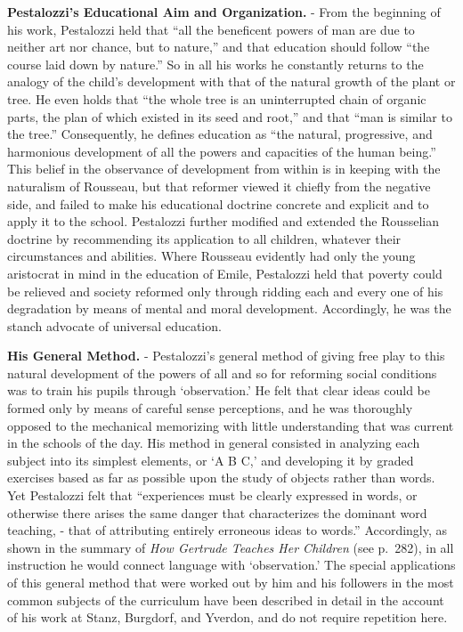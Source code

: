 \documentclass[]{book}
\begin{document}
\textbf{Pestalozzi's Educational Aim and Organization.} - From the beginning of his work, Pestalozzi held that ``all the beneficent powers of man are due to neither art nor chance, but to nature,'' and that education should follow ``the course laid down by nature.'' So in all his works he constantly returns to the analogy of the child's development with that of the natural growth of the plant or tree. He even holds that ``the whole tree is an uninterrupted chain of organic parts, the plan of which existed in its seed and root,'' and that ``man is similar to the tree.'' Consequently, he defines education as ``the natural, progressive, and harmonious development of all the powers and capacities of the human being.'' This belief in the observance of development from within is in keeping with the naturalism of Rousseau, but that reformer viewed it chiefly from the negative side, and failed to make his educational doctrine concrete and explicit and to apply it to the school. Pestalozzi further modified and extended the Rousselian doctrine by recommending its application to all children, whatever their circumstances and abilities. Where Rousseau evidently had only the young aristocrat in mind in the education of Emile, Pestalozzi held that poverty could be relieved and society reformed only through ridding each and every one of his degradation by means of mental and moral development. Accordingly, he was the stanch advocate of universal education.

\textbf{His General Method.} - Pestalozzi's general method of giving free play to this natural development of the powers of all and so for reforming social conditions was to train his pupils through `observation.' He felt that clear ideas could be formed only by means of careful sense perceptions, and he was thoroughly opposed to the mechanical memorizing with little understanding that was current in the schools of the day. His method in general consisted in analyzing each subject into its simplest elements, or `A B C,' and developing it by graded exercises based as far as possible upon the study of objects rather than words. Yet Pestalozzi felt that ``experiences must be clearly expressed in words, or otherwise there arises the same danger that characterizes the dominant word teaching, - that of attributing entirely erroneous ideas to words.'' Accordingly, as shown in the summary of \emph{How Gertrude Teaches Her Children} (see p.~282), in all instruction he would connect language with `observation.' The special applications of this general method that were worked out by him and his followers in the most common subjects of the curriculum have been described in detail in the account of his work at Stanz, Burgdorf, and Yverdon, and do not require repetition here.
\end{document}
